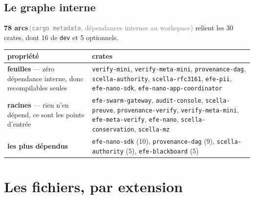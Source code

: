 \documentclass[10pt]{report}
\newcommand{\code}[1]{\texttt{\small #1}}
\newcommand{\mesure}[2]{\textbf{#1}\,\footnotesize\textcolor{grey}{(#2)}\normalsize}
\begin{document}
\subsection{Le graphe interne}

\mesure{78 arcs}{\code{cargo metadata}, dépendances internes au workspace} relient les 30 crates,
dont 16 de \code{dev} et 5 optionnels.

\begin{longtable}{@{}p{5.2cm}p{9.8cm}@{}}
\toprule \textbf{propriété} & \textbf{crates} \\ \midrule \endhead
\textbf{feuilles} --- zéro dépendance interne, donc recompilables seules & \code{verify-mini}, \code{verify-meta-mini}, \code{provenance-dag}, \code{scella-authority}, \code{scella-rfc3161}, \code{efe-pii}, \code{efe-nano-sdk}, \code{efe-nano-app-coordinator} \\
\textbf{racines} --- rien n'en dépend, ce sont les points d'entrée & \code{efe-swarm-gateway}, \code{audit-console}, \code{scella-preuve}, \code{provenance-verify}, \code{verify-meta-mini}, \code{efe-meta-verify}, \code{efe-nano}, \code{scella-conservation}, \code{scella-mz} \\
\textbf{les plus dépendus} & \code{efe-nano-sdk} (10), \code{provenance-dag} (9), \code{scella-authority} (5), \code{efe-blackboard} (5) \\
\bottomrule
\end{longtable}

\section{Les fichiers, par extension}
\end{document}
